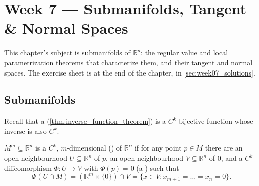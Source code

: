 \chapter{Week 7 --- Submanifolds, Tangent \& Normal Spaces}

This chapter's subject is submanifolds of $\mathbb{R}^n$: the regular value and local
parametrization theorems that characterize them, and their tangent and normal spaces. The
exercise sheet is at the end of the chapter, in \cref{sec:week07_solutions}.

\section{Submanifolds}
\label{sec:submanifolds}

Recall that a  (\cref{thm:inverse_function_theorem}) is a $C^k$
bijective function whose inverse is also $C^k$.

\begin{definition}[Submanifold]
\label{def:submanifold}
$M^m \subseteq \mathbb{R}^n$ is a $C^k$, $m$-dimensional 
() of $\mathbb{R}^n$ if for any point $p \in M$ there are an
open neighbourhood $U \subseteq \mathbb{R}^n$ of $p$, an open neighbourhood $V \subseteq
\mathbb{R}^n$ of $0$, and a $C^k$-diffeomorphism $\Phi : U \to V$ with $\Phi(p) = 0$ (a
) such that
\[\Phi(U \cap M) = (\mathbb{R}^m\times\{0\}) \cap V = \{x \in V : x_{m+1}=\dots=x_n=0\}.\]
\end{definition}

